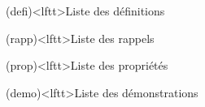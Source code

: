 \documentclass[../../main/main.tex]{subfiles}
\begin{document}

\vspace*{\fill}
\minitoc
\vspace*{\fill}

\newpage

\vspace*{\fill}
\begin{boxes}
	\begin{tcb}(defi)<lftt>{Liste des définitions}
	\end{tcb}
	\begin{tcb}(rapp)<lftt>{Liste des rappels}
	\end{tcb}
	\begin{tcb}(prop)<lftt>{Liste des propriétés}
	\end{tcb}
	\begin{tcb}(demo)<lftt>{Liste des démonstrations}
	\end{tcb}

\end{boxes}
\end{document}
